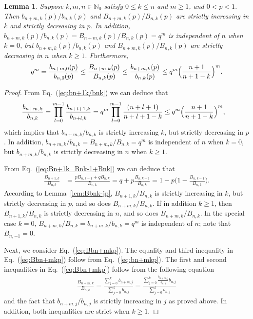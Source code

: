 \documentclass[aop]{imsart}
\theoremstyle{plain}
\newtheorem{lemma}[theorem]{Lemma}
\theoremstyle{remark}
\newcommand{\bbN}{\mathbb{N}}
\newcommand{\1}{\operatorname{\uppercase\expandafter{\romannumeral1}}}
\newcommand{\2}{\operatorname{\uppercase\expandafter{\romannumeral2}}}
\newcommand{\3}{\operatorname{\uppercase\expandafter{\romannumeral3}}}
\newcommand{\4}{\operatorname{\uppercase\expandafter{\romannumeral4}}}
\newcommand{\5}{\operatorname{\uppercase\expandafter{\romannumeral5}}}
\newcommand{\6}{\operatorname{\uppercase\expandafter{\romannumeral6}}}
\newcommand{\7}{\operatorname{\uppercase\expandafter{\romannumeral7}}}
\newcommand{\8}{\operatorname{\uppercase\expandafter{\romannumeral8}}}
\newcommand{\9}{\operatorname{\uppercase\expandafter{\romannumeral9}}}
\newcommand{\eref}[1]{Eq.~\textup{(\ref{#1})}}
\newcommand{\lref}[1]{Lemma~\ref{#1}}
\begin{document}
 

\begin{lemma}\label{lem:Bbn+mkp}
	Suppose  $k,m,n\in \bbN_0$ satisfy  $0\leq k\leq n$ and $m\geq 1$,  and $0<p<1$.	Then $b_{n+m,k}(p)/b_{n,k}(p)$ and  $B_{n+m,k}(p)/B_{n,k}(p)$ are strictly increasing in $k$ and  strictly decreasing in  $p$. In addition,
	$b_{n+m,k}(p)/b_{n,k}(p)=B_{n+m,k}(p)/B_{n,k}(p)=q^m$ is independent of $n$ when $k=0$, but	
	$b_{n+m,k}(p)/b_{n,k}(p)$ and  $B_{n+m,k}(p)/B_{n,k}(p)$ are strictly decreasing in  $n$ when $k\geq 1$. Furthermore,
	\begin{align}\label{eq:Bbn+mkp}
	q^m =\frac{b_{n+m,0}(p)}{b_{n,0}(p)}\leq  \frac{B_{n+m,k}(p)}{B_{n,k}(p)}\leq \frac{b_{n+m,k}(p)}{b_{n,k}(p)} \leq q^m\Bigl(\frac{n+1}{n+1-k}\Bigr)^m. 
	\end{align}	
\end{lemma}

\begin{proof}
	From \eref{eq:bn+1k/bnk} we can deduce that	
	\begin{align}\label{eq:bn+mkp}
\frac{b_{n+m,k}}{b_{n,k}}&=\prod_{l=0}^{m-1}\frac{b_{n+l+1,k}}{b_{n+l,k}}=q^m\prod_{l=0}^{m-1}
\frac{(n+l+1)}{n+l+1-k}\leq q^m
\Bigl(\frac{n+1}{n+1-k}\Bigr)^m, 
\end{align}			
which implies that $b_{n+m,k}/b_{n,k}$ is strictly increasing $k$, but strictly decreasing in $p$. In addition,
	$b_{n+m,k}/b_{n,k}=B_{n+m,k}/B_{n,k}=q^m$ is independent of $n$ when $k=0$, but	
	$b_{n+m,k}/b_{n,k}$ is strictly decreasing in  $n$ when $k\geq 1$.
	

	
From \eref{eq:Bn+1k=Bnk-1+Bnk} we can deduce that	
	\begin{align}
	\frac{B_{n+1,k}}{B_{n,k}}&=\frac{p B_{n,k-1}+q B_{n,k}}{B_{n,k}}=q+p \frac{B_{n,k-1}}{B_{n,k}}=1-p\biggl(1-\frac{B_{n,k-1}}{B_{n,k}}\biggr).
	\end{align}
According to \lref{lem:Bbnk-jp}, 
$B_{n+1,k}/B_{n,k}$ is strictly increasing  in $k$, but strictly decreasing in  $p$, and so does $B_{n+m,k}/B_{n,k}$. 
	If in addition $k\geq 1$, then 
	$B_{n+1,k}/B_{n,k}$ is strictly decreasing in $n$, and so does $B_{n+m,k}/B_{n,k}$. In the special case $k=0$, $B_{n+m,k}/B_{n,k}=b_{n+m,k}/b_{n,k}=q^m$ is independent of $n$; note that $B_{n,-1}=0$.
	
	Next, we consider \eref{eq:Bbn+mkp}. The equality and third inequality in \eref{eq:Bbn+mkp} follow from \eref{eq:bn+mkp}.  The first and second inequalities in \eref{eq:Bbn+mkp} follow from  the following equation 
	\begin{align}
	\frac{B_{n+m,k}}{B_{n,k}}
	=\frac{\sum_{j=0}^k b_{n+m,j}}{\sum_{j=0}^k b_{n,j}}
	=\frac{\sum_{j=0}^k \frac{b_{n+m,j}}{b_{n,j}} b_{n,j}}{\sum_{j=0}^k b_{n,j}}
	\end{align}
	and the fact that $b_{n+m,j}/b_{n,j}$ is strictly increasing in $j$ as proved above.  In addition, both inequalities are strict when $k\geq 1$.
\end{proof}
\end{document}
